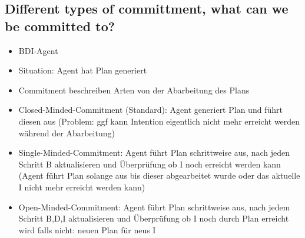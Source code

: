 \subsection{Different types of committment, what can we be committed to?}
\begin{itemize}
	\item BDI-Agent
	\item Situation: Agent hat Plan generiert
	\item Commitment beschreiben Arten von der Abarbeitung des Plans
	\item Closed-Minded-Commitment (Standard): Agent generiert Plan und führt diesen aus (Problem: ggf kann Intention eigentlich nicht mehr erreicht werden während der Abarbeitung)
	\item Single-Minded-Commitment: Agent führt Plan schrittweise aus, nach jeden Schritt B aktualisieren und Überprüfung ob I noch erreicht werden kann (Agent führt Plan solange aus bis dieser abgearbeitet wurde oder das aktuelle I nicht mehr erreicht werden kann)
	\item Open-Minded-Commitment: Agent führt Plan schrittweise aus, nach jedem Schritt B,D,I aktualisieren und Überprüfung ob I noch durch Plan erreicht wird falls nicht: neuen Plan für neus I
\end{itemize}
